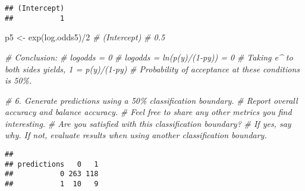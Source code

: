 \documentclass[
]{article}
\newenvironment{Shaded}{\begin{snugshade}}{\end{snugshade}}
\newcommand{\CommentTok}[1]{\textcolor[rgb]{0.56,0.35,0.01}{\textit{#1}}}
\newcommand{\DecValTok}[1]{\textcolor[rgb]{0.00,0.00,0.81}{#1}}
\newcommand{\FloatTok}[1]{\textcolor[rgb]{0.00,0.00,0.81}{#1}}
\newcommand{\FunctionTok}[1]{\textcolor[rgb]{0.00,0.00,0.00}{#1}}
\newcommand{\NormalTok}[1]{#1}
\newcommand{\OtherTok}[1]{\textcolor[rgb]{0.56,0.35,0.01}{#1}}
\newcommand{\SpecialCharTok}[1]{\textcolor[rgb]{0.00,0.00,0.00}{#1}}
\begin{document}
\begin{verbatim}
## (Intercept) 
##           1
\end{verbatim}

\begin{Shaded}
\begin{Highlighting}[]
\NormalTok{p5 }\OtherTok{\textless{}{-}} \FunctionTok{exp}\NormalTok{(log.odds5)}\SpecialCharTok{/}\DecValTok{2}
    \CommentTok{\# (Intercept) }
    \CommentTok{\# 0.5}

\CommentTok{\# Conclusion:}
\CommentTok{\# logodds = 0}
\CommentTok{\# logodds = ln(p(y)/(1{-}py)) = 0}
\CommentTok{\# Taking e\^{}  to both sides yields, 1 = p(y)/(1{-}py)}
\CommentTok{\# Probability of acceptance at these conditions is 50\%.  }



\CommentTok{\# 6.    Generate predictions using a 50\% classification boundary. }
\CommentTok{\#     Report overall accuracy and balance accuracy. }
\CommentTok{\#     Feel free to share any other metrics you find interesting. }
\CommentTok{\#     Are you satisfied with this classification boundary? }
\CommentTok{\#     If yes, say why. If not, evaluate results when using another classification boundary. }
\end{Highlighting}
\end{Shaded}

\begin{Shaded}
\end{Shaded}

\begin{verbatim}
##            
## predictions   0   1
##           0 263 118
##           1  10   9
\end{verbatim}
\end{document}
